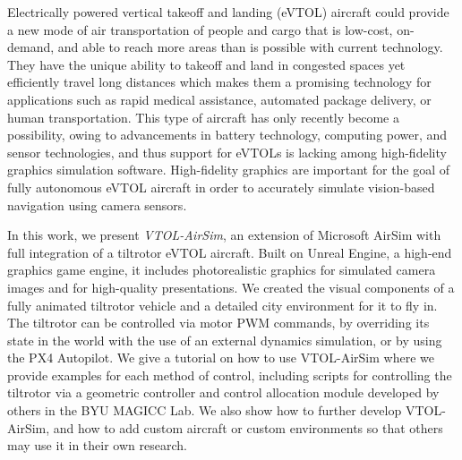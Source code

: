 \afterpage{\cleardoublepage}


Electrically powered vertical takeoff and landing (eVTOL) aircraft could provide a new mode of air transportation of people and cargo that is low-cost, on-demand, and able to reach more areas than is possible with current technology. They have the unique ability to takeoff and land in congested spaces yet efficiently travel long distances which makes them a promising technology for applications such as rapid medical assistance, automated package delivery, or human transportation. This type of aircraft has only recently become a possibility, owing to advancements in battery technology, computing power, and sensor technologies, and thus support for eVTOLs is lacking among high-fidelity graphics simulation software. High-fidelity graphics are important for the goal of fully autonomous eVTOL aircraft in order to accurately simulate vision-based navigation using camera sensors.

In this work, we present \textit{VTOL-AirSim}, an extension of Microsoft AirSim with full integration of a tiltrotor eVTOL aircraft. Built on Unreal Engine, a high-end graphics game engine, it includes photorealistic graphics for simulated camera images and for high-quality presentations. We created the visual components of a fully animated tiltrotor vehicle and a detailed city environment for it to fly in. The tiltrotor can be controlled via motor PWM commands, by overriding its state in the world with the use of an external dynamics simulation, or by using the PX4 Autopilot. We give a tutorial on how to use VTOL-AirSim where we provide examples for each method of control, including scripts for controlling the tiltrotor via a geometric controller and control allocation module developed by others in the BYU MAGICC Lab. We also show how to further develop VTOL-AirSim, and how to add custom aircraft or custom environments so that others may use it in their own research.